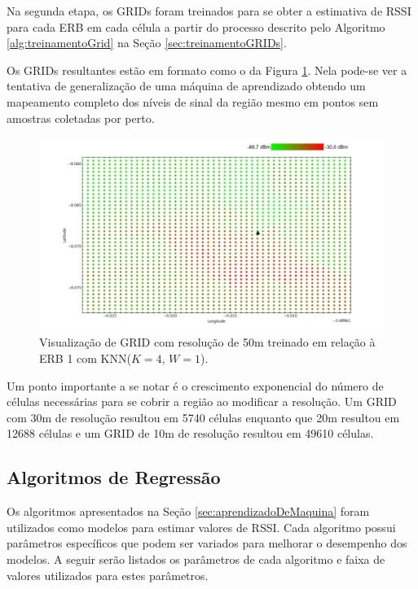 \documentclass[12pt]{article}
\begin{document}
        Na segunda etapa, os GRIDs foram treinados para se obter a estimativa de RSSI para cada ERB em cada célula a partir do processo descrito pelo Algoritmo \ref{alg:treinamentoGrid} na Seção \ref{sec:treinamentoGRIDs}.
        
        Os GRIDs resultantes estão em formato como o da Figura \ref{fig:visualizacaoGrid}. Nela pode-se ver a tentativa de generalização de uma máquina de aprendizado obtendo um mapeamento completo dos níveis de sinal da região mesmo em pontos sem amostras coletadas por perto.
        
        \begin{figure}[H]
        \centering
        \includegraphics[width=16cm]{images/visualizacaoGrid.png}\par
        \caption{Visualização de GRID com resolução de 50m treinado em relação à ERB 1 com KNN($K=4$, $W=1$).}
        \label{fig:visualizacaoGrid}
        \end{figure}
        
        Um ponto importante a se notar é o crescimento exponencial do número de células necessárias para se cobrir a região ao modificar a resolução. Um GRID com 30m de resolução resultou em 5740 células enquanto que 20m resultou em 12688 células e um GRID de 10m de resolução resultou em 49610 células. 
        
        \subsection{Algoritmos de Regressão}
        \label{sec:experimentoParametros}
        
        Os algoritmos apresentados na Seção \ref{sec:aprendizadoDeMaquina} foram utilizados como modelos para estimar valores de RSSI. Cada algoritmo possui parâmetros específicos que podem ser variados para melhorar o desempenho dos modelos. A seguir serão listados os parâmetros de cada algoritmo e faixa de valores utilizados para estes parâmetros. 
        
\end{document}
